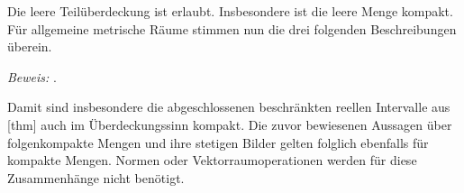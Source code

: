 Die leere Teilüberdeckung ist erlaubt. Insbesondere ist die leere Menge
kompakt. Für allgemeine metrische Räume stimmen nun die drei folgenden
Beschreibungen überein.

\noindent\emph{Beweis:} .

Damit sind insbesondere die abgeschlossenen beschränkten reellen Intervalle
aus [thm]
auch im Überdeckungssinn kompakt. Die zuvor bewiesenen Aussagen über
folgenkompakte Mengen und ihre stetigen Bilder gelten folglich ebenfalls
für kompakte Mengen. Normen oder Vektorraumoperationen werden für diese
Zusammenhänge nicht benötigt.
